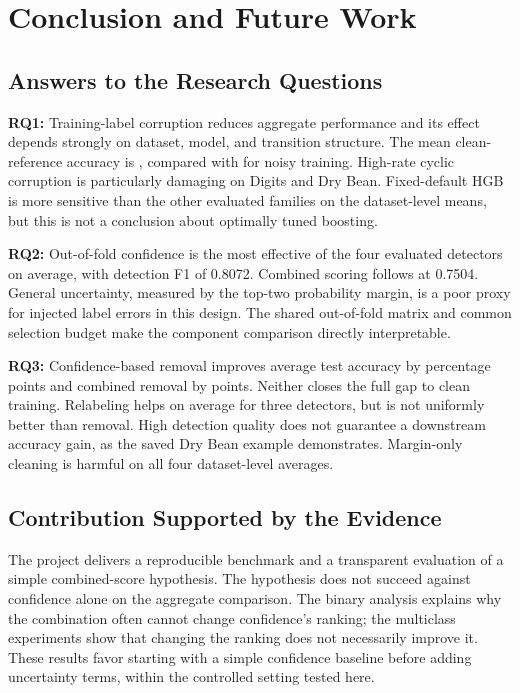 \chapter{Conclusion and Future Work}
\section{Answers to the Research Questions}
\textbf{RQ1:} Training-label corruption reduces aggregate performance and
its effect depends strongly on dataset, model, and transition structure.
The mean clean-reference accuracy is \CleanAccuracy{}, compared with
\NoisyAccuracy{} for noisy training. High-rate cyclic corruption is
particularly damaging on Digits and Dry Bean. Fixed-default HGB is more
sensitive than the other evaluated families on the dataset-level means,
but this is not a conclusion about optimally tuned boosting.

\textbf{RQ2:} Out-of-fold confidence is the most effective of the four
evaluated detectors on average, with detection F1 of 0.8072. Combined
scoring follows at 0.7504. General uncertainty, measured by the top-two
probability margin, is a poor proxy for injected label errors in this design.
The shared out-of-fold matrix and common selection budget make the component
comparison directly interpretable.

\textbf{RQ3:} Confidence-based removal improves average test accuracy by
\ConfidenceRemoveGain{} percentage points and combined removal by
\CombinedRemoveGain{} points. Neither closes the full gap to clean training.
Relabeling helps on average for three detectors, but is not uniformly better
than removal. High detection quality does not guarantee a downstream accuracy
gain, as the saved Dry Bean example demonstrates. Margin-only cleaning is
harmful on all four dataset-level averages.

\section{Contribution Supported by the Evidence}
The project delivers a reproducible benchmark and a transparent evaluation of
a simple combined-score hypothesis. The hypothesis does not succeed against
confidence alone on the aggregate comparison. The binary analysis explains
why the combination often cannot change confidence's ranking; the multiclass
experiments show that changing the ranking does not necessarily improve it.
These results favor starting with a simple confidence baseline before adding
uncertainty terms, within the controlled setting tested here.


